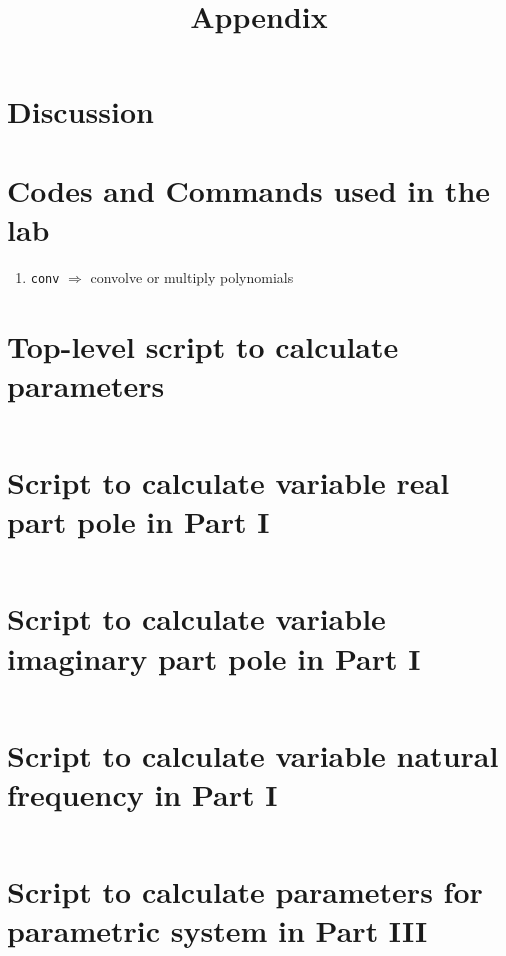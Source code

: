 \documentclass[11pt]{article}
\begin{document}
\section{Discussion}

\newpage
\appendix
\title{Appendix}\label{doc:apx}
\maketitle

\section{Codes and Commands used in the lab}

\begin{enumerate}
    \item
        \texttt{conv}
        \tabto{1.5in}
        \(\Rightarrow\) convolve or multiply polynomials
\end{enumerate}

\section{Top-level script to calculate parameters}\label{apx:top param}
\inputminted{matlab}{lab0405/programs/time_response_params_m1.m}

\section{Script to calculate variable real part pole in Part I}
\inputminted{matlab}{lab0405/programs/part0102_reals_m1.m}

\section{Script to calculate variable imaginary part pole in Part I}
\inputminted{matlab}{lab0405/programs/part0103_imags_m1.m}

\section{Script to calculate variable natural frequency in Part I}
\inputminted{matlab}{lab0405/programs/part0104_nat_freqs_m1.m}

\section{Script to calculate parameters for parametric system in Part III}\label{apx:last param}
\inputminted{matlab}{lab0405/programs/part03_params_m1.m}
\end{document}
